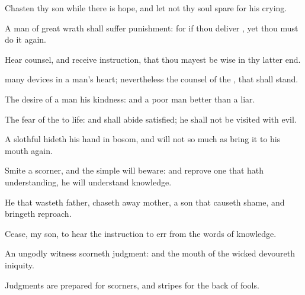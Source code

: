 {Chasten thy
son while there
is
hope, and let not thy
soul
spare for his
crying.

A
man of
great
wrath shall
suffer
punishment: for if thou
deliver
{}, yet thou must do it
again.

Hear
counsel, and
receive
instruction, that thou mayest be
wise in thy latter
end.

many
devices in a
man’s
heart; nevertheless the
counsel of the
{}, that shall
stand.

The
desire of a
man
{} his
kindness: and a poor
man
{}
better
than a
liar.

The
fear of the
{}
{} to
life: and
{} shall
abide
satisfied; he shall not be
visited with
evil.

A
slothful
{}
hideth his
hand in
{}
bosom, and will not so much as
bring it to his
mouth
again.

Smite a
scorner, and the
simple will
beware: and
reprove one that hath
understanding,
{} he will
understand
knowledge.

He that
wasteth
{}
father,
{} chaseth
away
{}
mother,
{} a
son that causeth
shame, and bringeth
reproach.

Cease, my
son, to
hear the
instruction
{} to
err from the
words of
knowledge.

An
ungodly
witness
scorneth
judgment: and the
mouth of the
wicked
devoureth
iniquity.

Judgments are
prepared for
scorners, and
stripes for the
back of
fools.




\par }
